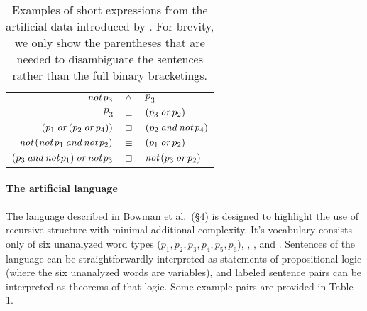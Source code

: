 \begin{table}[tp]
  \centering\small
    \begin{tabular}[t]{r c l}
      \toprule
      $\mathop{\textit{not}} p_3$        & $\mathbin{^{\wedge}}$ & $p_3$ \\
      $p_3$               & $\sqsubset$ & $(p_3 \mathbin{\textit{or}} p_2)$ \\
      $(p_1 \mathbin{\textit{or}} (p_2 \mathbin{\textit{or}} p_4))$               & $\sqsupset$ & $(p_2 \mathbin{\textit{and}}  \mathop{\textit{not}} p_4)$ \\
      $\mathop{\textit{not}}\, (\mathop{\textit{not}} p_1 \mathbin{\textit{and}} \mathop{\textit{not}} p_2)$ & $\equiv$ & $(p_1 \mathbin{\textit{or}} p_2)$ \\ 
      $(p_3 \mathbin{\textit{and}} \mathop{\textit{not}} p_1 ) \mathbin{\textit{or}} \mathop{\textit{not}} p_3$    & $\sqsupset$& $\mathop{\textit{not}}\, (p_3 \mathbin{\textit{or}} p_2)$ \\
      \bottomrule
    \end{tabular}
    \caption{Examples of short expressions from the artificial data introduced by \protect\citealt{Bowman:Potts:Manning:2014}. For brevity, we only show the parentheses that are needed to disambiguate the sentences rather than the full binary bracketings.}\label{tab:plexs}
\end{table}


\paragraph{The artificial language} The language described in Bowman et al.~(\S4) is designed to highlight the use of recursive structure with minimal additional complexity. It's vocabulary consists only of six unanalyzed word types ($p_1, p_2, p_3, p_4, p_5, p_6$), , , and . Sentences of the language can be straightforwardly interpreted as statements of propositional logic (where the six unanalyzed words are variables), and labeled sentence pairs can be interpreted as theorems of that logic. Some example pairs are provided in Table \ref{tab:plexs}.

